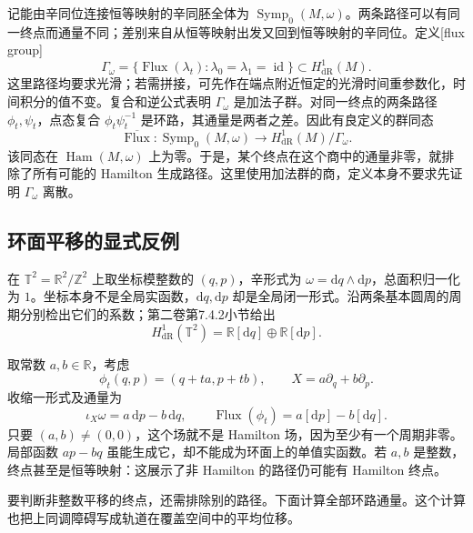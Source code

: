 记能由辛同位连接恒等映射的辛同胚全体为 \(\operatorname{Symp}_0(M,\omega)\)。两条路径可以有同一终点而通量不同；差别来自从恒等映射出发又回到恒等映射的辛同位。定义[flux group]
\[
	\Gamma_\omega
	=\{\operatorname{Flux}(\lambda_t):\lambda_0=\lambda_1=\operatorname{id}\}
	\subset H^1_{\mathrm{dR}}(M).
\]
这里路径均要求光滑；若需拼接，可先作在端点附近恒定的光滑时间重参数化，时间积分的值不变。复合和逆公式表明 \(\Gamma_\omega\) 是加法子群。对同一终点的两条路径 \(\phi_t,\psi_t\)，点态复合 \(\phi_t\psi_t^{-1}\) 是环路，其通量是两者之差。因此有良定义的群同态
\begin{equation}\label{g4:eq:0903:endpoint-flux}
	\overline{\operatorname{Flux}}:
	\operatorname{Symp}_0(M,\omega)
	\longrightarrow H^1_{\mathrm{dR}}(M)/\Gamma_\omega.
\end{equation}
该同态在 \(\operatorname{Ham}(M,\omega)\) 上为零。于是，某个终点在这个商中的通量非零，就排除了所有可能的 Hamilton 生成路径。这里使用加法群的商，定义本身不要求先证明 \(\Gamma_\omega\) 离散。

\subsection{环面平移的显式反例}
\label{g4:subsec:0903:04}

在 \(\mathbb T^2=\mathbb R^2/\mathbb Z^2\) 上取坐标模整数的 \((q,p)\)，辛形式为 \(\omega=\mathrm{d}q\wedge\mathrm{d}p\)，总面积归一化为 \(1\)。坐标本身不是全局实函数，\(\mathrm{d}q,\mathrm{d}p\) 却是全局闭一形式。沿两条基本圆周的周期分别检出它们的系数；第二卷第7.4.2小节给出
\[
	H^1_{\mathrm{dR}}(\mathbb T^2)
	=\mathbb R[\mathrm{d}q]\oplus\mathbb R[\mathrm{d}p].
\]

\begin{example}\label{g4:exm:0903:translation-path}
	取常数 \(a,b\in\mathbb R\)，考虑
	\[
		\phi_t(q,p)=(q+ta,p+tb),\qquad
		X=a\partial_q+b\partial_p.
	\]
	收缩一形式及通量为
	\[
		\iota_X\omega=a\,\mathrm{d}p-b\,\mathrm{d}q,
		\qquad \operatorname{Flux}(\phi_t)
		=a[\mathrm{d}p]-b[\mathrm{d}q].
	\]
	只要 \((a,b)\ne(0,0)\)，这个场就不是 Hamilton 场，因为至少有一个周期非零。局部函数 \(ap-bq\) 虽能生成它，却不能成为环面上的单值实函数。若 \(a,b\) 是整数，终点甚至是恒等映射：这展示了非 Hamilton 的路径仍可能有 Hamilton 终点。
\end{example}

要判断非整数平移的终点，还需排除别的路径。下面计算全部环路通量。这个计算也把上同调障碍写成轨道在覆盖空间中的平均位移。

